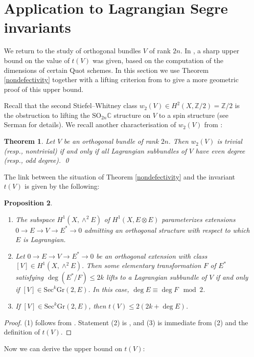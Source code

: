 \documentclass[10pt]{amsart}
\numberwithin{equation}{section}
\newcommand{\cc}{\mathbb C}
\newcommand{\Z}{\mathbb Z}
\newcommand{\Sec}{\mathrm{Sec}}
\newcommand{\Gr}{\mathrm{Gr}}
\newtheorem{theorem}{{\textbf Theorem}}[section]
\newtheorem{prop}[theorem]{{\textbf Proposition}}
\begin{document}
\section{Application to Lagrangian Segre invariants}

We return to the study of orthogonal bundles $V$ of rank $2n$. In \cite[Theorem 1.3 (1)]{CH3}, a sharp upper bound on the value of $t(V)$ was given, based on the computation of the dimensions of certain Quot schemes. In this section we use Theorem \ref{nondefectivity} together with a lifting criterion from \cite{CH3} to give a more geometric proof of this upper bound.

Recall that the second Stiefel--Whitney class $w_2(V) \in H^2 (X, \Z/2) = \Z / 2$ is the obstruction to lifting the $\mathrm{SO}_{2n} \cc$ structure on $V$ to a spin structure (see Serman \cite{S} for details). We recall another characterisation of $w_2(V)$ from \cite[Theorem 1.2 (2)]{CH3}:

\begin{theorem} \label{parity} Let $V$ be an orthogonal bundle of rank $2n$. Then $w_2 (V)$ is trivial (resp., nontrivial) if and only if all Lagrangian subbundles of $V$ have even degree (resp., odd degree). \qed \end{theorem}

\noindent The link between the situation of Theorem \ref{nondefectivity} and the invariant $t(V)$ is given by the following:
\begin{prop} \label{secantSegre} \begin{enumerate}
\renewcommand{\labelenumi}{(\arabic{enumi})}
\item The subspace $H^{1}(X, \wedge^2 E)$ of $H^1 (X, E \otimes E)$ parameterizes extensions $0 \to E \to V \to E^* \to 0$ admitting an orthogonal structure with respect to which $E$ is Lagrangian. 
\item Let $0 \to E \to V \to E^* \to 0$ be an orthogonal extension with class $[V] \in H^1 (X, \wedge^2 E)$. Then some elementary transformation $F$ of $E^*$ satisfying $\deg(E^* / F) \le 2k$ lifts to a Lagrangian subbundle of $V$ if and only if $[V] \in \Sec^k \Gr(2, E)$. In this case, $\deg E \equiv \deg F \mod 2$.
\item If $[V] \in \Sec^k \Gr(2, E)$, then $t(V) \le 2(2k + \deg E)$.
\end{enumerate} \end{prop}
\begin{proof} (1) follows from \cite[Criterion 2.1]{Hit1}. Statement (2) is \cite[Criterion 2.2 (2)]{CH3}, and (3) is immediate from (2) and the definition of $t(V)$. \end{proof}
%
Now we can derive the upper bound on $t(V)$:
\end{document}
